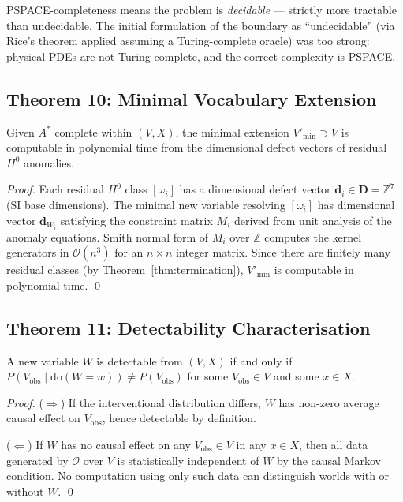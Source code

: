 \documentclass[twoside,11pt]{article}
\newcommand{\OA}{\mathcal{O}}
\newcommand{\doOp}{\mathrm{do}}
\begin{document}
\begin{remark}
\textrm{PSPACE}-completeness means the problem is \emph{decidable}
--- strictly more tractable than undecidable. The initial formulation
of the boundary as ``undecidable'' (via Rice's theorem applied
assuming a Turing-complete oracle) was too strong: physical PDEs
are not Turing-complete, and the correct complexity is
\textrm{PSPACE}.
\end{remark}

\subsection{Theorem 10: Minimal Vocabulary Extension}

\begin{theorem}
\label{thm:minvocab}
Given $A^*$ complete within $(V, X)$, the minimal extension
$V'_{\min} \supset V$ is computable in polynomial time from the
dimensional defect vectors of residual $H^0$ anomalies.
\end{theorem}

\begin{proof}
Each residual $H^0$ class $[\omega_i]$ has a dimensional defect
vector $\mathbf{d}_i \in \mathbf{D} = \mathbb{Z}^7$ (SI base
dimensions). The minimal new variable resolving $[\omega_i]$ has
dimensional vector $\mathbf{d}_{W_i}$ satisfying the constraint
matrix $M_i$ derived from unit analysis of the anomaly equations.
Smith normal form of $M_i$ over $\mathbb{Z}$ computes the kernel
generators in $\mathcal{O}(n^3)$ for an $n \times n$ integer matrix.
Since there are finitely many residual classes (by
Theorem~\ref{thm:termination}), $V'_{\min}$ is computable in
polynomial time. \qed
\end{proof}

\subsection{Theorem 11: Detectability Characterisation}

\begin{theorem}[Detectability]
\label{thm:detectability}
A new variable $W$ is detectable from $(V, X)$ if and only if
$P(V_{\mathrm{obs}} \mid \doOp(W{=}w)) \neq P(V_{\mathrm{obs}})$
for some $V_{\mathrm{obs}} \in V$ and some $x \in X$.
\end{theorem}

\begin{proof}
($\Rightarrow$) If the interventional distribution differs, $W$
has non-zero average causal effect on $V_{\mathrm{obs}}$, hence
detectable by definition.

($\Leftarrow$) If $W$ has no causal effect on any $V_{\mathrm{obs}}
\in V$ in any $x \in X$, then all data generated by $\OA$ over $V$
is statistically independent of $W$ by the causal Markov condition.
No computation using only such data can distinguish worlds with or
without $W$. \qed
\end{proof}
\end{document}
